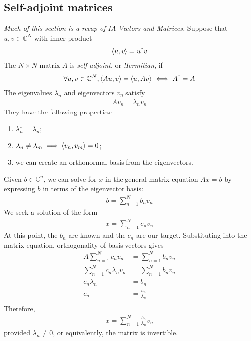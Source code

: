    \subsection{Self-adjoint matrices}
    \textit{Much of this section is a recap of IA Vectors and Matrices.}
    Suppose that $u, v \in \mathbb C^N$ with inner product
    \begin{align*}
        \left\langle{u,v}\right\rangle = u^\dagger v
    \end{align*}
    The $N \times N$ matrix $A$ is \textit{self-adjoint}, or \textit{Hermitian}, if
    \begin{align*}
        \forall u,v \in \mathbb C^N, \left\langle{Au, v}\right\rangle = \left\langle{u, Av}\right\rangle \iff A^\dagger = A
    \end{align*}
    The eigenvalues $\lambda_n$ and eigenvectors $v_n$ satisfy
    \begin{align*}
        A v_n = \lambda_n v_n
    \end{align*}
    They have the following properties:
    \begin{enumerate}
        \item $\lambda_n^\star = \lambda_n$;
        \item $\lambda_n \neq \lambda_m \implies \left\langle{ v_n, v_m }\right\rangle = 0$;
        \item we can create an orthonormal basis from the eigenvectors.
    \end{enumerate}
    Given $b \in \mathbb C^n$, we can solve for $x$ in the general matrix equation $Ax = b$ by expressing $b$ in terms of the eigenvector basis:
    \begin{align*}
        b = \sum_{n=1}^N b_n v_n
    \end{align*}
    We seek a solution of the form
    \begin{align*}
        x = \sum_{n=1}^N c_n v_n
    \end{align*}
    At this point, the $b_n$ are known and the $c_n$ are our target.
    Substituting into the matrix equation, orthogonality of basis vectors gives
    \begin{align*}
        A \sum_{n=1}^N c_n v_n         & = \sum_{n=1}^N b_n v_n  \\
        \sum_{n=1}^N c_n \lambda_n v_n & = \sum_{n=1}^N b_n v_n  \\
        c_n \lambda_n                  & = b_n                   \\
        c_n                            & = \frac{b_n}{\lambda_n} \\
    \end{align*}
    Therefore,
    \begin{align*}
        x = \sum_{n=1}^N \frac{b_n}{\lambda_n} v_n
    \end{align*}
    provided $\lambda_n \neq 0$, or equivalently, the matrix is invertible.

